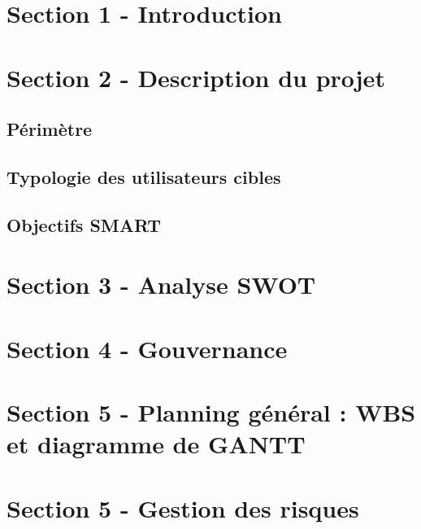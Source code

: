 \documentclass[a4paper,12pt]{article}
\begin{document}


\section{Section 1 - Introduction}



\section{Section 2 - Description du projet}



\subsection{Périmètre}



\subsection{Typologie des utilisateurs cibles}



\subsection{Objectifs SMART}



\section{Section 3 - Analyse SWOT}



\section{Section 4 - Gouvernance}



\section{Section 5 - Planning général : WBS et diagramme de GANTT}



\section{Section 5 - Gestion des risques}
\end{document}
